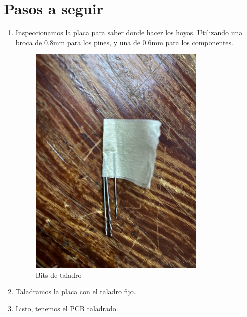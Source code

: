 \documentclass[12pt]{report}
\begin{document}
\section{Pasos a seguir}
\begin{enumerate}
  \item Inspeccionamos la placa para saber donde hacer los hoyos. Utilizando una broca de 0.8mm para los pines, y una de 0.6mm para los componentes.
  \begin{figure}[H]
      \centering
      \includegraphics[width=0.8\textwidth]{screenshots/Bits.jpeg}
      \caption{Bits de taladro}
      \label{fig:placaConDiseno}
  \end{figure}
  \item Taladramos la placa con el taladro fijo.
  \item Listo, tenemos el PCB taladrado.
\end{enumerate}
\newpage
\end{document}
